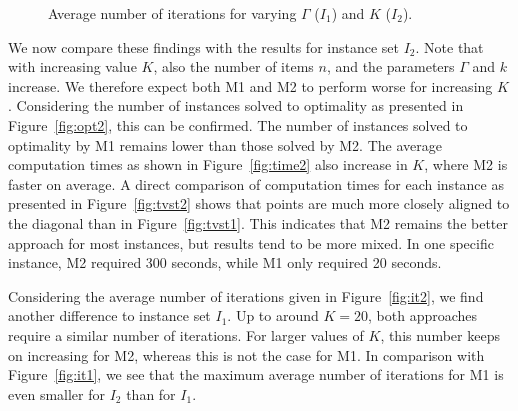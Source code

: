 \begin{figure}[htbp]
\begin{center}
%
\hfill
{}
\end{center}
\caption{Average number of iterations for varying $\Gamma$ ($I_1$) and $K$ ($I_2$).\label{fig:it}}
\end{figure}	

We now compare these findings with the results for instance set $I_2$. Note that with increasing value $K$, also the number of items $n$, and the parameters $\Gamma$ and $k$ increase. We therefore expect both M1 and M2 to perform worse for increasing $K$. Considering the number of instances solved to optimality as presented in Figure~\ref{fig:opt2}, this can be confirmed. The number of instances solved to optimality by M1 remains lower than those solved by M2. The average computation times as shown in Figure~\ref{fig:time2} also increase in $K$, where M2 is faster on average. A direct comparison of computation times for each instance as presented in Figure~\ref{fig:tvst2} shows that points are much more closely aligned to the diagonal than in Figure~\ref{fig:tvst1}. This indicates that M2 remains the better approach for most instances, but results tend to be more mixed. In one specific instance, M2 required 300 seconds, while M1 only required 20 seconds.

Considering the average number of iterations given in Figure~\ref{fig:it2}, we find another difference to instance set $I_1$. Up to around $K=20$, both approaches require a similar number of iterations. For larger values of $K$, this number keeps on increasing for M2, whereas this is not the case for M1. In comparison with Figure~\ref{fig:it1}, we see that the maximum average number of iterations for M1 is even smaller for $I_2$ than for $I_1$.

